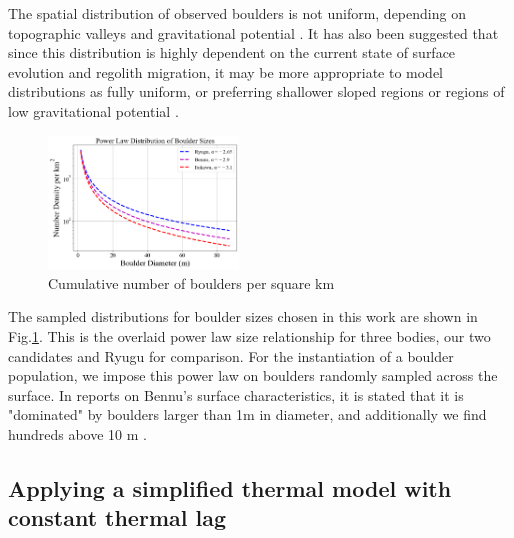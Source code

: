 The spatial distribution of observed boulders is not uniform, depending on topographic valleys and gravitational potential \cite{Jawin2020}. It has also been suggested that since this distribution is highly dependent on the current state of surface evolution and regolith migration, it may be more appropriate to model distributions as fully uniform, or preferring shallower sloped regions or regions of low gravitational potential \cite{Jawin2022}. 
\begin{figure}[H]
    \centering
    \includegraphics[width=0.45\textwidth]{fig/boulder_sizes_power_law.png}
    \caption{Cumulative number of boulders per square km}
    \label{fig:bs}
\end{figure}

\indent The sampled distributions for boulder sizes chosen in this work are shown in Fig.\ref{fig:bs}. This is the overlaid power law size relationship for three bodies, our two candidates and Ryugu for comparison. For the instantiation of a boulder population, we impose this power law on boulders randomly sampled across the surface. In reports on Bennu's surface characteristics, it is stated that it is "dominated" by boulders larger than 1m in diameter, and additionally we find hundreds above 10 m \cite{DellaGiustina2019}. 

\subsection{Applying a simplified thermal model with constant thermal lag} \label{STM}

